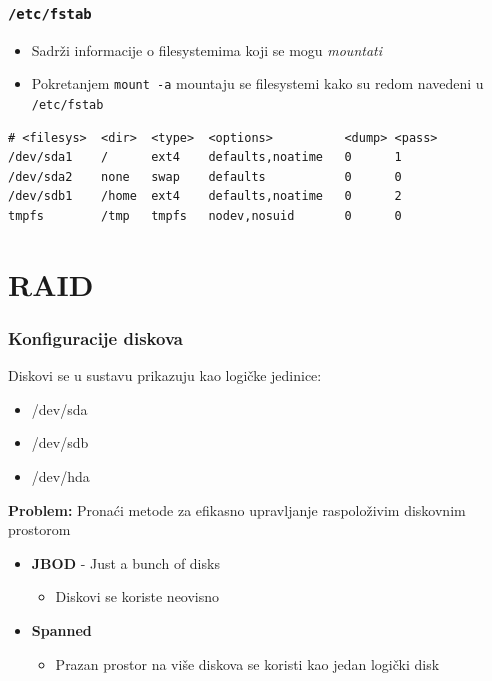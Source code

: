 \documentclass[t]{beamer}
\begin{document}
\begin{frame}[fragile]
	\frametitle{\texttt{/etc/fstab}}
	\begin{itemize}
		\item Sadrži informacije o filesystemima koji se mogu \textit{mountati}
		\item Pokretanjem \texttt{mount -a} mountaju se filesystemi kako su redom navedeni u \texttt{/etc/fstab}
	\end{itemize}
\begin{verbatim}
# <filesys>  <dir>  <type>  <options>          <dump> <pass>
/dev/sda1    /      ext4    defaults,noatime   0      1
/dev/sda2    none   swap    defaults           0      0
/dev/sdb1    /home  ext4    defaults,noatime   0      2
tmpfs        /tmp   tmpfs   nodev,nosuid       0      0
\end{verbatim}
\end{frame}

\section{RAID}
\begin{frame}
	\frametitle{Konfiguracije diskova}
	Diskovi se u sustavu prikazuju kao logičke jedinice:
	{\ttfamily
		\begin{itemize}
			\item[] /dev/sda
			\item[] /dev/sdb
			\item[] /dev/hda
		\end{itemize}
	}
	\textbf{Problem:} Pronaći metode za efikasno upravljanje raspoloživim diskovnim prostorom
	\vfill
	\begin{itemize}
		\item \textbf{JBOD} - Just a bunch of disks
		\begin{itemize}
			\item Diskovi se koriste neovisno
		\end{itemize}
		\item \textbf{Spanned}
		\begin{itemize}
			\item Prazan prostor na više diskova se koristi kao jedan logički disk
		\end{itemize}
	\end{itemize}
\end{frame}
\end{document}
